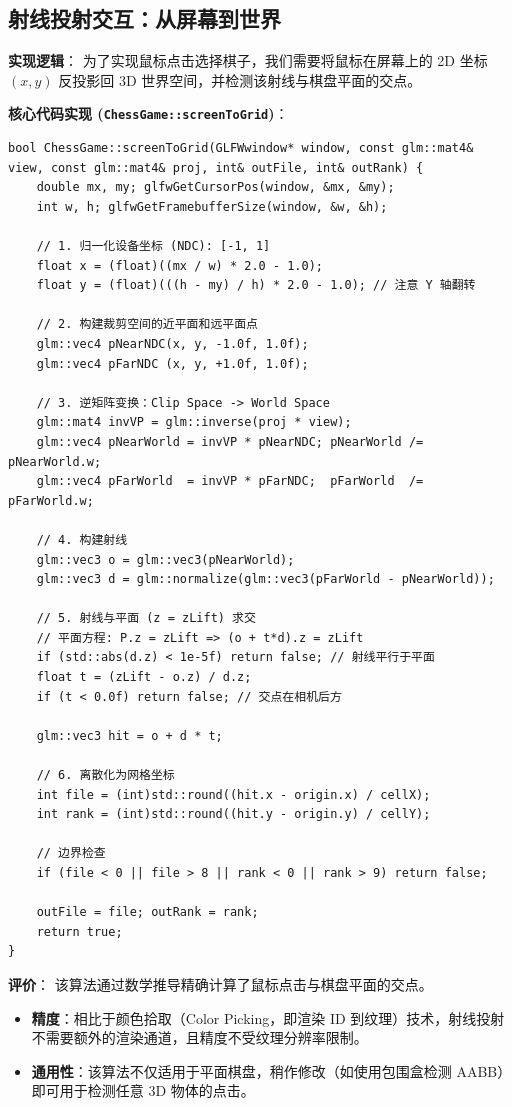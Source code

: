 \documentclass[a4paper]{article}
\begin{document}
\subsection{射线投射交互：从屏幕到世界}

\textbf{实现逻辑}：
为了实现鼠标点击选择棋子，我们需要将鼠标在屏幕上的 2D 坐标 $(x, y)$ 反投影回 3D 世界空间，并检测该射线与棋盘平面的交点。

\textbf{核心代码实现 (\texttt{ChessGame::screenToGrid})}：

\begin{lstlisting}[caption={射线投射与平面求交算法}]
bool ChessGame::screenToGrid(GLFWwindow* window, const glm::mat4& view, const glm::mat4& proj, int& outFile, int& outRank) {
    double mx, my; glfwGetCursorPos(window, &mx, &my);
    int w, h; glfwGetFramebufferSize(window, &w, &h);

    // 1. 归一化设备坐标 (NDC): [-1, 1]
    float x = (float)((mx / w) * 2.0 - 1.0);
    float y = (float)(((h - my) / h) * 2.0 - 1.0); // 注意 Y 轴翻转

    // 2. 构建裁剪空间的近平面和远平面点
    glm::vec4 pNearNDC(x, y, -1.0f, 1.0f);
    glm::vec4 pFarNDC (x, y, +1.0f, 1.0f);

    // 3. 逆矩阵变换：Clip Space -> World Space
    glm::mat4 invVP = glm::inverse(proj * view);
    glm::vec4 pNearWorld = invVP * pNearNDC; pNearWorld /= pNearWorld.w;
    glm::vec4 pFarWorld  = invVP * pFarNDC;  pFarWorld  /= pFarWorld.w;

    // 4. 构建射线
    glm::vec3 o = glm::vec3(pNearWorld);
    glm::vec3 d = glm::normalize(glm::vec3(pFarWorld - pNearWorld));

    // 5. 射线与平面 (z = zLift) 求交
    // 平面方程: P.z = zLift => (o + t*d).z = zLift
    if (std::abs(d.z) < 1e-5f) return false; // 射线平行于平面
    float t = (zLift - o.z) / d.z;
    if (t < 0.0f) return false; // 交点在相机后方

    glm::vec3 hit = o + d * t;

    // 6. 离散化为网格坐标
    int file = (int)std::round((hit.x - origin.x) / cellX);
    int rank = (int)std::round((hit.y - origin.y) / cellY);
    
    // 边界检查
    if (file < 0 || file > 8 || rank < 0 || rank > 9) return false;

    outFile = file; outRank = rank;
    return true;
}
\end{lstlisting}

\textbf{评价}：
该算法通过数学推导精确计算了鼠标点击与棋盘平面的交点。
\begin{itemize}
    \item \textbf{精度}：相比于颜色拾取（Color Picking，即渲染 ID 到纹理）技术，射线投射不需要额外的渲染通道，且精度不受纹理分辨率限制。
    \item \textbf{通用性}：该算法不仅适用于平面棋盘，稍作修改（如使用包围盒检测 AABB）即可用于检测任意 3D 物体的点击。
\end{itemize}
\end{document}
